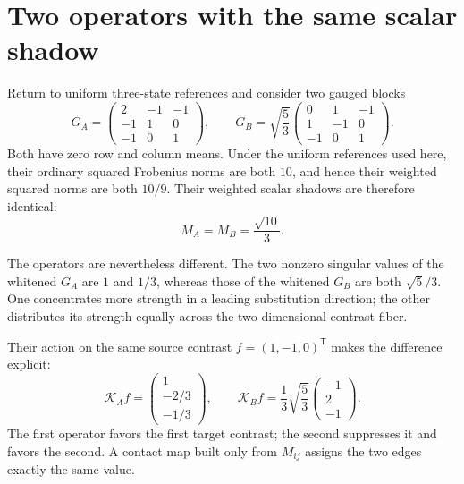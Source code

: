 \section*{Two operators with the same scalar shadow}

Return to uniform three-state references and consider two gauged blocks
\begin{equation}
G_A=
\begin{pmatrix}
2&-1&-1\\
-1&1&0\\
-1&0&1
\end{pmatrix},
\qquad
G_B=\sqrt{\frac53}
\begin{pmatrix}
0&1&-1\\
1&-1&0\\
-1&0&1
\end{pmatrix}.
\label{eq:book-same-shadow-blocks}
\end{equation}
Both have zero row and column means.  Under the uniform references used here, their ordinary
squared Frobenius norms are both $10$, and hence their weighted squared norms are both $10/9$.
Their weighted scalar shadows are therefore identical:
\begin{equation}
M_A=M_B=\frac{\sqrt{10}}{3}.
\label{eq:book-same-shadow-norm}
\end{equation}

The operators are nevertheless different.  The two nonzero singular values of the whitened
$G_A$ are $1$ and $1/3$, whereas those of the whitened $G_B$ are both $\sqrt5/3$.  One concentrates
more strength in a leading substitution direction; the other distributes its strength equally
across the two-dimensional contrast fiber.

Their action on the same source contrast $f=(1,-1,0)^{\mathsf T}$ makes the difference explicit:
\begin{equation}
\mathcal K_Af
=
\begin{pmatrix}
1\\[-2pt]-2/3\\[-2pt]-1/3
\end{pmatrix},
\qquad
\mathcal K_Bf
=\frac{1}{3}\sqrt{\frac53}
\begin{pmatrix}
-1\\[-2pt]2\\[-2pt]-1
\end{pmatrix}.
\label{eq:book-same-shadow-actions}
\end{equation}
The first operator favors the first target contrast; the second suppresses it and favors the
second.  A contact map built only from $M_{ij}$ assigns the two edges exactly the same value.

